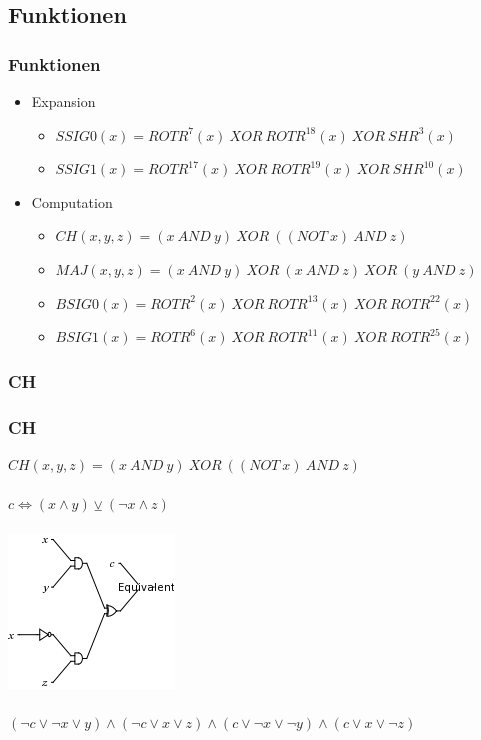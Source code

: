 \documentclass{beamer}
\begin{document}
\subsection{Funktionen}
  \begin{frame}
    \frametitle{Funktionen}
    \begin{itemize}
      \setlength{\itemsep}{20pt}
      \item Expansion
        \begin{itemize}
          \setlength{\itemsep}{10pt}
          \item $ SSIG0(x) = ROTR^{7}(x)~XOR~ROTR^{18}(x)~XOR~SHR^{3}(x) $
          \item $ SSIG1(x) = ROTR^{17}(x)~XOR~ROTR^{19}(x)~XOR~SHR^{10}(x) $
        \end{itemize}
      \item Computation
        \begin{itemize}
          \setlength{\itemsep}{10pt}
          \item $ CH( x, y, z) = (x~AND~y)~XOR~( (NOT~x)~AND~z) $
          \item $ MAJ( x, y, z) = (x~AND~y)~XOR~(x~AND~z)~XOR~(y~AND~z) $
          \item $ BSIG0(x) = ROTR^{2}(x)~XOR~ROTR^{13}(x)~XOR~ROTR^{22}(x) $
          \item $ BSIG1(x) = ROTR^{6}(x)~XOR~ROTR^{11}(x)~XOR~ROTR^{25}(x) $
        \end{itemize}
    \end{itemize}
  \end{frame}
\subsubsection{CH}
  \begin{frame}
    \frametitle{CH}
    $ CH( x, y, z) = (x~AND~y)~XOR~( (NOT~x)~AND~z) $\\
    ~\\
    $ c \Leftrightarrow (x \wedge y) \veebar ( \neg x \wedge z) $\\
    ~\\
    \includegraphics[scale=0.5]{ch.png}\\
    ~\\
    $ (\neg c \vee \neg x \vee y) \wedge (\neg c \vee x \vee z) \wedge (c \vee \neg x \vee \neg y) \wedge (c \vee x \vee \neg z) $
  \end{frame}
\end{document}
